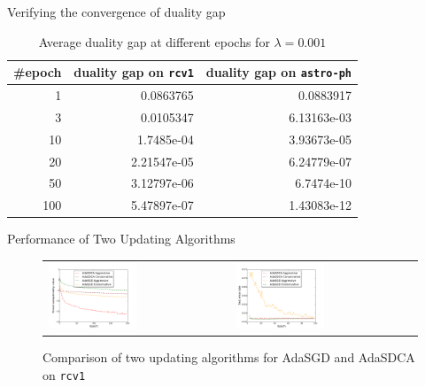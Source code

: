 \begin{frame}{Verifying the convergence of duality gap}
\begin{table}[htbp]
    \centering
    \caption{Average duality gap at different epochs for $\lambda = 0.001$} 
    \label{table:covdual1}
    \begin{tabular}{|r|r|r|}
        \hline
        \#epoch & duality gap on \texttt{rcv1} & duality gap on \texttt{astro-ph} \\ 
        \hline
        1 & 0.0863765 & 0.0883917\\
        3 & 0.0105347 & 6.13163e-03 \\
        10 & 1.7485e-04 & 3.93673e-05 \\
        20 & 2.21547e-05 & 6.24779e-07 \\
        50 & 3.12797e-06 & 6.7474e-10\\
        100 & 5.47897e-07 & 1.43083e-12 \\
        \hline
    \end{tabular}
\end{table}
\end{frame}

\begin{frame}{Performance of Two Updating Algorithms}
\begin{figure}[htbp]
\begin{tabular}{ll}
    \centering
        \includegraphics[width=0.5\textwidth]{images/two_updates_obej.pdf} &
        \includegraphics[width=0.5\textwidth]{images/two_updates_terror.pdf}
\end{tabular}
    \caption{Comparison of two updating algorithms for AdaSGD and AdaSDCA on \texttt{rcv1}}
    \label{fig:two_updates}
\end{figure}
\end{frame}

